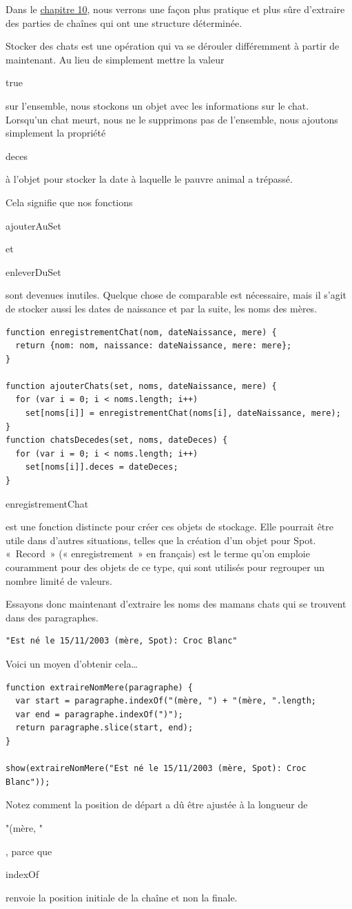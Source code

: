 \documentclass{FramateX}
\renewcommand{\texttt}[1]{\begin{sffamily}{#1}\end{sffamily}}
\begin{document}
Dans le \href{chapter10.html}{chapitre 10}, nous verrons une façon plus
pratique et plus sûre d'extraire des parties de chaînes qui ont une
structure déterminée.

\begin{center}\end{center}

Stocker des chats est une opération qui va se dérouler différemment à
partir de maintenant. Au lieu de simplement mettre la valeur
\texttt{true} sur l'ensemble, nous stockons un objet avec les
informations sur le chat. Lorsqu'un chat meurt, nous ne le supprimons
pas de l'ensemble, nous ajoutons simplement la propriété \texttt{deces}
à l'objet pour stocker la date à laquelle le pauvre animal a trépassé.

Cela signifie que nos fonctions \texttt{ajouterAuSet} et
\texttt{enleverDuSet} sont devenues inutiles. Quelque chose de
comparable est nécessaire, mais il s'agit de stocker aussi les dates de
naissance et par la suite, les noms des mères.

\begin{lstlisting}
function enregistrementChat(nom, dateNaissance, mere) {
  return {nom: nom, naissance: dateNaissance, mere: mere};
}

function ajouterChats(set, noms, dateNaissance, mere) {
  for (var i = 0; i < noms.length; i++)
    set[noms[i]] = enregistrementChat(noms[i], dateNaissance, mere);
}
function chatsDecedes(set, noms, dateDeces) {
  for (var i = 0; i < noms.length; i++)
    set[noms[i]].deces = dateDeces;
}
\end{lstlisting}
\texttt{enregistrementChat} est une fonction distincte pour créer ces
objets de stockage. Elle pourrait être utile dans d'autres situations,
telles que la création d'un objet pour Spot. «~Record~» («
enregistrement~» en français) est le terme qu'on emploie couramment pour
des objets de ce type, qui sont utilisés pour regrouper un nombre limité
de valeurs.

\begin{center}\end{center}

Essayons donc maintenant d'extraire les noms des mamans chats qui se
trouvent dans des paragraphes.

\begin{lstlisting}
"Est né le 15/11/2003 (mère, Spot): Croc Blanc"
\end{lstlisting}
Voici un moyen d'obtenir cela\ldots{}

\begin{lstlisting}
function extraireNomMere(paragraphe) {
  var start = paragraphe.indexOf("(mère, ") + "(mère, ".length;
  var end = paragraphe.indexOf(")");
  return paragraphe.slice(start, end);
}

show(extraireNomMere("Est né le 15/11/2003 (mère, Spot): Croc Blanc"));
\end{lstlisting}
Notez comment la position de départ a dû être ajustée à la longueur de
\texttt{"(mère, "}, parce que \texttt{indexOf} renvoie la position
initiale de la chaîne et non la finale.
\end{document}
